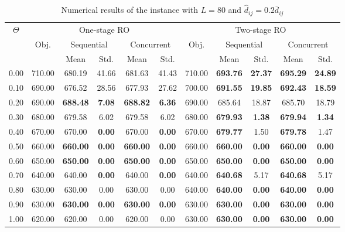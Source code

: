 \documentclass[preprint,review,10pt,round,authoryear]{elsarticle}\usepackage[]{graphicx}\usepackage[]{color}
\theoremstyle{plain}
\theoremstyle{definition}
\theoremstyle{remark}
\begin{document}
\begin{table*}[!ht]
      \small
      \caption{Numerical results of the instance with $L=80$ and $\hat{d}_{ij}= 0.2\bar{d}_{ij} $}
      \begin{center}
      \begin{tabular}{||c| c| c| c| c| c| c| c| c|c|c||}
      \hline
      \hline
      \multirow{3}{*}{$\Theta$} &
      \multicolumn{5}{|c|}{One-stage RO} &
      \multicolumn{5}{|c||}{Two-stage RO} \\
      \cline{2-6}
      \cline{7-11}
      &\multirow{2}{*}{Obj.} &
      \multicolumn{2}{|c|}{Sequential} &
      \multicolumn{2}{|c|}{Concurrent} &
      \multirow{2}{*}{Obj.} &
      \multicolumn{2}{|c|}{Sequential} &
      \multicolumn{2}{|c||}{Concurrent}\\
      \cline{3-6}
      \cline{8-11}
      &&Mean&Std.&Mean&Std.&&Mean&Std.&Mean&Std.\\
      \hline%
  \hline
0.00 & 710.00 & 680.19 & 41.66 & 681.63 & 41.43 & 710.00 & \textbf{693.76} & \textbf{27.37} & \textbf{695.29} & \textbf{24.89} \\ 
   \hline
0.10 & 690.00 & 676.52 & 28.56 & 677.93 & 27.62 & 700.00 & \textbf{691.55} & \textbf{19.85} & \textbf{692.43} & \textbf{18.59} \\ 
   \hline
0.20 & 690.00 & \textbf{688.48} & \textbf{7.08} & \textbf{688.82} & \textbf{6.36} & 690.00 & 685.64 & 18.87 & 685.70 & 18.79 \\ 
   \hline
0.30 & 680.00 & 679.58 & 6.02 & 679.58 & 6.02 & 680.00 & \textbf{679.93} & \textbf{1.38} & \textbf{679.94} & \textbf{1.34} \\ 
   \hline
0.40 & 670.00 & 670.00 & \textbf{0.00} & 670.00 & \textbf{0.00} & 670.00 & \textbf{679.77} & 1.50 & \textbf{679.78} & 1.47 \\ 
   \hline
0.50 & 660.00 & \textbf{660.00} & \textbf{0.00} & \textbf{660.00} & \textbf{0.00} & 660.00 & \textbf{660.00} & \textbf{0.00} & \textbf{660.00} & \textbf{0.00} \\ 
   \hline
0.60 & 650.00 & \textbf{650.00} & \textbf{0.00} & \textbf{650.00} & \textbf{0.00} & 650.00 & \textbf{650.00} & \textbf{0.00} & \textbf{650.00} & \textbf{0.00} \\ 
   \hline
0.70 & 640.00 & 640.00 & \textbf{0.00} & 640.00 & \textbf{0.00} & 640.00 & \textbf{640.68} & 5.17 & \textbf{640.68} & 5.17 \\ 
   \hline
0.80 & 630.00 & 630.00 & 0.00 & 630.00 & 0.00 & 640.00 & \textbf{640.00} & \textbf{0.00} & \textbf{640.00} & \textbf{0.00} \\ 
   \hline
0.90 & 630.00 & \textbf{630.00} & \textbf{0.00} & \textbf{630.00} & \textbf{0.00} & 630.00 & \textbf{630.00} & \textbf{0.00} & \textbf{630.00} & \textbf{0.00} \\ 
   \hline
1.00 & 620.00 & 620.00 & 0.00 & 620.00 & 0.00 & 630.00 & \textbf{630.00} & \textbf{0.00} & \textbf{630.00} & \textbf{0.00} \\ 
  \hline
\hline
      \end{tabular}
      \end{center}
      \label{table:1}
      \end{table*}
\end{document}
